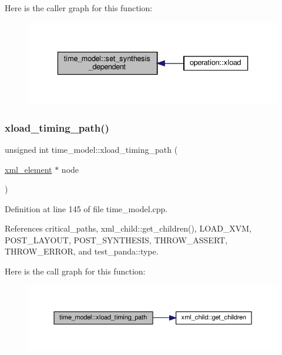Here is the caller graph for this function\+:
\nopagebreak
\begin{figure}[H]
\begin{center}
\leavevmode
\includegraphics[width=336pt]{d3/d73/classtime__model_a481cdb29f6fd68bc79d6d25adf916c9a_icgraph}
\end{center}
\end{figure}
\mbox{\label{classtime__model_aebf9b09a8d792f8628585d77c26f0f5c}} 
\subsubsection{\texorpdfstring{xload\+\_\+timing\+\_\+path()}{xload\_timing\_path()}}
{\footnotesize\ttfamily unsigned int time\+\_\+model\+::xload\+\_\+timing\+\_\+path (\begin{DoxyParamCaption}\item[{\hyperlink{classxml__element}{xml\+\_\+element} $\ast$}]{node }\end{DoxyParamCaption})\hspace{0.3cm}{\ttfamily [virtual]}}



Definition at line 145 of file time\+\_\+model.\+cpp.



References critical\+\_\+paths, xml\+\_\+child\+::get\+\_\+children(), L\+O\+A\+D\+\_\+\+X\+VM, P\+O\+S\+T\+\_\+\+L\+A\+Y\+O\+UT, P\+O\+S\+T\+\_\+\+S\+Y\+N\+T\+H\+E\+S\+IS, T\+H\+R\+O\+W\+\_\+\+A\+S\+S\+E\+RT, T\+H\+R\+O\+W\+\_\+\+E\+R\+R\+OR, and test\+\_\+panda\+::type.

Here is the call graph for this function\+:
\nopagebreak
\begin{figure}[H]
\begin{center}
\leavevmode
\includegraphics[width=350pt]{d3/d73/classtime__model_aebf9b09a8d792f8628585d77c26f0f5c_cgraph}
\end{center}
\end{figure}
\mbox{\label{classtime__model_a6f2a76cabb6407289e757cbdc155260d}} 
